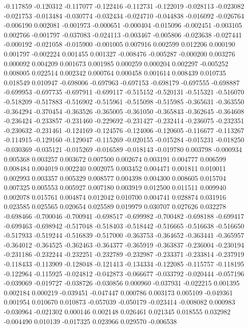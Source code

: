 -0.117859
-0.120312
-0.117077
-0.122416
-0.112731
-0.122019
-0.028113
-0.023082
-0.021753
-0.013484
-0.030774
-0.032434
-0.024710
-0.044838
-0.016092
-0.026764
-0.006190
0.002081
-0.001973
-0.000651
-0.000404
-0.015096
-0.002451
-0.003105
0.002766
-0.001797
-0.037083
-0.024113
-0.003467
-0.005806
-0.023638
-0.027441
-0.000192
-0.021058
-0.015900
-0.001005
0.007916
0.002599
0.012206
0.000190
0.001797
-0.002224
0.001455
0.001327
-0.008476
-0.005287
-0.000200
0.003276
0.000092
0.004209
0.001673
0.001985
0.000259
0.000204
0.002297
-0.005252
0.008005
0.022514
0.002342
0.000764
0.000458
0.001614
0.008439
0.010735
0.018549
0.010947
-0.698006
-0.697963
-0.697153
-0.698179
-0.697555
-0.698887
-0.699953
-0.697735
-0.697911
-0.699117
-0.515152
-0.520131
-0.515321
-0.516070
-0.518209
-0.517883
-0.516902
-0.515961
-0.515098
-0.515985
-0.365631
-0.363550
-0.364294
-0.370454
-0.363526
-0.365005
-0.361050
-0.365843
-0.362645
-0.364608
-0.236424
-0.233857
-0.231460
-0.229692
-0.231427
-0.232414
-0.236075
-0.232351
-0.230632
-0.231461
-0.124169
-0.124576
-0.124006
-0.120605
-0.116677
-0.113267
-0.114915
-0.129160
-0.129047
-0.115269
-0.020155
-0.015284
-0.015231
-0.018250
-0.030369
-0.035121
-0.015269
-0.016589
-0.018143
-0.019780
0.003798
-0.000934
0.005368
0.003257
0.003672
0.007500
0.002674
0.003191
0.004777
0.006599
0.008484
0.004019
0.002240
0.002075
0.003452
0.004471
0.001811
0.010011
0.002993
0.003357
0.005329
0.008577
0.004398
0.004300
0.008605
0.015704
0.007325
0.005553
0.005927
0.007180
0.003919
0.012500
0.011511
0.009940
0.002078
0.015761
0.004874
0.012042
0.010700
0.004741
0.028874
0.031916
0.023585
0.025565
0.020654
0.025589
0.019979
0.030707
0.027626
0.032278
-0.698466
-0.700046
-0.700941
-0.698517
-0.699982
-0.700482
-0.698188
-0.699417
-0.699463
-0.698942
-0.517048
-0.518403
-0.518442
-0.516665
-0.516638
-0.516650
-0.517933
-0.519244
-0.516839
-0.517000
-0.363753
-0.364652
-0.363441
-0.365957
-0.364012
-0.364525
-0.362463
-0.364377
-0.365919
-0.363837
-0.236004
-0.230194
-0.231186
-0.232244
-0.232251
-0.232789
-0.232987
-0.233371
-0.233814
-0.237919
-0.118433
-0.113909
-0.128048
-0.121413
-0.134334
-0.122085
-0.115757
-0.118195
-0.122964
-0.115925
-0.024812
-0.042873
-0.066677
-0.033792
-0.020444
-0.057196
-0.039069
-0.019727
-0.038726
-0.030856
0.000960
-0.037931
-0.022215
0.001395
0.002184
0.000219
-0.039451
-0.047447
0.000786
0.003173
0.005109
-0.049361
0.001954
0.010670
0.010873
-0.057039
-0.050179
-0.023414
-0.008082
0.000983
-0.030964
-0.021302
0.000146
0.002148
0.026461
0.021345
0.018555
0.032982
-0.004490
0.010139
-0.017325
0.023966
0.029570
-0.006538

